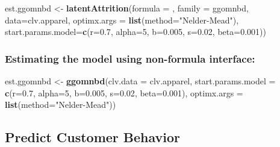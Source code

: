 \documentclass[
]{article}
\newenvironment{Shaded}{\begin{snugshade}}{\end{snugshade}}
\newcommand{\AttributeTok}[1]{\textcolor[rgb]{0.13,0.29,0.53}{#1}}
\newcommand{\DecValTok}[1]{\textcolor[rgb]{0.00,0.00,0.81}{#1}}
\newcommand{\FloatTok}[1]{\textcolor[rgb]{0.00,0.00,0.81}{#1}}
\newcommand{\FunctionTok}[1]{\textcolor[rgb]{0.13,0.29,0.53}{\textbf{#1}}}
\newcommand{\NormalTok}[1]{#1}
\newcommand{\OtherTok}[1]{\textcolor[rgb]{0.56,0.35,0.01}{#1}}
\newcommand{\StringTok}[1]{\textcolor[rgb]{0.31,0.60,0.02}{#1}}
\begin{document}
\begin{Shaded}
\begin{Highlighting}[]
\NormalTok{  est.ggomnbd }\OtherTok{\textless{}{-}} \FunctionTok{latentAttrition}\NormalTok{(}\AttributeTok{formula =}\NormalTok{ , }\AttributeTok{family =}\NormalTok{ ggomnbd, }\AttributeTok{data=}\NormalTok{clv.apparel, }
                                 \AttributeTok{optimx.args =} \FunctionTok{list}\NormalTok{(}\AttributeTok{method=}\StringTok{"Nelder{-}Mead"}\NormalTok{),}
                                 \AttributeTok{start.params.model=}\FunctionTok{c}\NormalTok{(}\AttributeTok{r=}\FloatTok{0.7}\NormalTok{, }\AttributeTok{alpha=}\DecValTok{5}\NormalTok{, }\AttributeTok{b=}\FloatTok{0.005}\NormalTok{,  }\AttributeTok{s=}\FloatTok{0.02}\NormalTok{, }\AttributeTok{beta=}\FloatTok{0.001}\NormalTok{))}
\end{Highlighting}
\end{Shaded}

\subsubsection{\texorpdfstring{\textbf{Estimating the model using
non-formula
interface:}}{Estimating the model using non-formula interface:}}\label{estimating-the-model-using-non-formula-interface-1}

\begin{Shaded}
\begin{Highlighting}[]
\NormalTok{est.ggomnbd }\OtherTok{\textless{}{-}} \FunctionTok{ggomnbd}\NormalTok{(}\AttributeTok{clv.data =}\NormalTok{ clv.apparel, }
                       \AttributeTok{start.params.model =} \FunctionTok{c}\NormalTok{(}\AttributeTok{r=}\FloatTok{0.7}\NormalTok{, }\AttributeTok{alpha=}\DecValTok{5}\NormalTok{, }\AttributeTok{b=}\FloatTok{0.005}\NormalTok{,  }\AttributeTok{s=}\FloatTok{0.02}\NormalTok{, }\AttributeTok{beta=}\FloatTok{0.001}\NormalTok{), }
                       \AttributeTok{optimx.args =} \FunctionTok{list}\NormalTok{(}\AttributeTok{method=}\StringTok{"Nelder{-}Mead"}\NormalTok{))}
\end{Highlighting}
\end{Shaded}

\subsection{Predict Customer Behavior}\label{predict}
\end{document}
